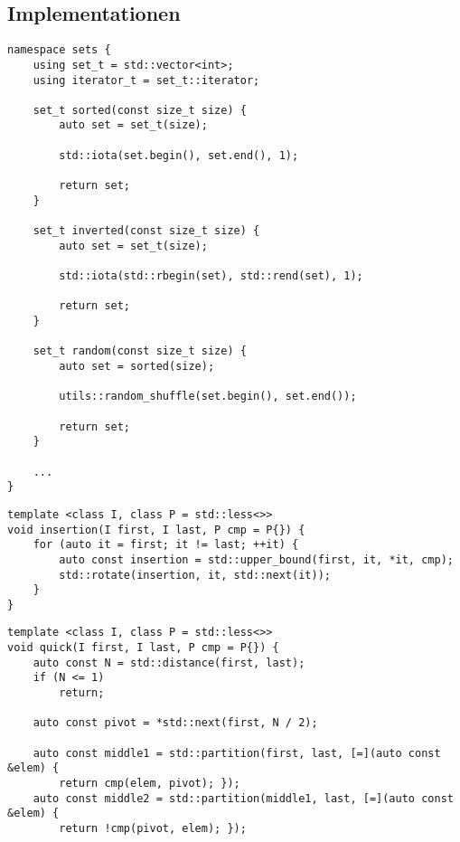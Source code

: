 \begin{appendices}

\chapter{Implementationen}


\begin{lstlisting}[label=lst:sets, caption={Implementation von \enquote{Generatoren} für diverse Arten von Eingabemengen.}]
namespace sets {
	using set_t = std::vector<int>;
	using iterator_t = set_t::iterator;

	set_t sorted(const size_t size) {
		auto set = set_t(size);

		std::iota(set.begin(), set.end(), 1);

		return set;
	}

	set_t inverted(const size_t size) {
		auto set = set_t(size);

		std::iota(std::rbegin(set), std::rend(set), 1);

		return set;
	}

	set_t random(const size_t size) {
		auto set = sorted(size);

		utils::random_shuffle(set.begin(), set.end());

		return set;
	}

	...
}
\end{lstlisting}

\begin{lstlisting}[float, label=lst:insertion, caption={Implementation des \emph{insertion sort}.}]
template <class I, class P = std::less<>>
void insertion(I first, I last, P cmp = P{}) {
	for (auto it = first; it != last; ++it) {
		auto const insertion = std::upper_bound(first, it, *it, cmp);
		std::rotate(insertion, it, std::next(it));
	}
}
\end{lstlisting}

\begin{lstlisting}[float, label=lst:quick, caption={Implementation des \emph{quicksort}.}]
template <class I, class P = std::less<>>
void quick(I first, I last, P cmp = P{}) {
	auto const N = std::distance(first, last);
	if (N <= 1)
		return;

	auto const pivot = *std::next(first, N / 2);

	auto const middle1 = std::partition(first, last, [=](auto const &elem) {
		return cmp(elem, pivot); });
	auto const middle2 = std::partition(middle1, last, [=](auto const &elem) {
		return !cmp(pivot, elem); });


\end{lstlisting}
\end{appendices}
